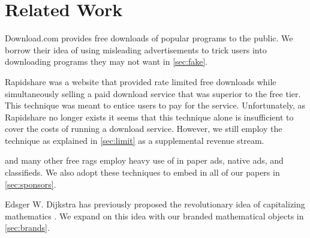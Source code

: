\section{Related Work}
\label{sec:related}

Download.com \cite{download-com} provides free downloads of popular programs to
the public.
We borrow their idea of using misleading advertisements to trick users into
downloading programs they may not want in \autoref{sec:fake}.

Rapidshare \cite{rapidshare} was a website that provided rate limited free
downloads while simultaneously selling a paid download service that was
superior to the free tier.
This technique was meant to entice users to pay for the service.
Unfortunately, as Rapidshare no longer exists it seems that this technique
alone is insufficient to cover the costs of running a download service.
However, we still employ the technique as explained in \autoref{sec:limit} as a
supplemental revenue stream.

 and many other free rags employ heavy use of in paper ads,
native ads, and classifieds.
We also adopt these techniques to embed in all of our papers in
\autoref{sec:sponsors}.

Edsger W. Dijkstra has previously proposed the revolutionary idea of
capitalizing mathematics \cite{cap-math}.
We expand on this idea with our branded mathematical objects in
\autoref{sec:brands}.
